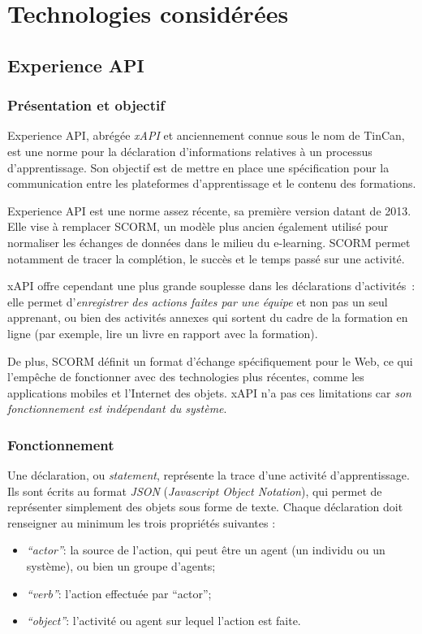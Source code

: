\chapter{Technologies considérées}

    \section{Experience API}

        \subsection{Présentation et objectif}

            Experience API, abrégée \emph{xAPI} et anciennement connue sous le nom de TinCan, est une norme pour la déclaration d’informations relatives à un processus d’apprentissage. Son objectif est de mettre en place une spécification pour la communication entre les plateformes d’apprentissage et le contenu des formations.

            Experience API est une norme assez récente, sa première version datant de 2013. Elle vise à remplacer SCORM, un modèle plus ancien également utilisé pour normaliser les échanges de données dans le milieu du e-learning. SCORM permet notamment de tracer la complétion, le succès et le temps passé sur une activité.

            xAPI offre cependant une plus grande souplesse dans les déclarations d’activités~: elle permet d’\emph{enregistrer des actions faites par une équipe} et non pas un seul apprenant, ou bien des activités annexes qui sortent du cadre de la formation en ligne (par exemple, lire un livre en rapport avec la formation).

            De plus, SCORM définit un format d’échange spécifiquement pour le Web, ce qui l’empêche de fonctionner avec des technologies plus récentes, comme les applications mobiles et l’Internet des objets. xAPI n’a pas ces limitations car \emph{son fonctionnement est indépendant du système}.

        \subsection{Fonctionnement}

            \def\myitem#1{\item \emph{\enquote{#1}}:\hspace{2mm}}

            Une déclaration, ou \emph{statement}, représente la trace d’une activité d’apprentissage. Ils sont écrits au format \emph{JSON} (\emph{Javascript Object Notation}), qui permet de représenter simplement des objets sous forme de texte. Chaque déclaration doit renseigner au minimum les trois propriétés suivantes :
            \begin{itemize}
                \myitem{actor} la source de l’action, qui peut être un agent (un individu ou un système), ou bien un groupe d’agents;
                \myitem{verb} l’action effectuée par \enquote{actor};
                \myitem{object} l’activité ou agent sur lequel l’action est faite.
            \end{itemize}

